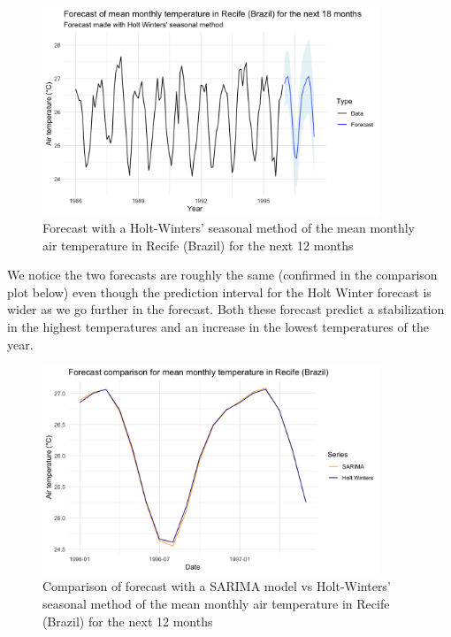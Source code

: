 \begin{figure}[H]
	\centering
	\includegraphics[width=0.9\textwidth]{figures/forecast/hw_forecast.png}
	\caption{Forecast with a Holt-Winters' seasonal method of the mean monthly air temperature in Recife (Brazil) for the next 12 months}
	\label{fig:hw-forecast}
\end{figure}

We notice the two forecasts are roughly the same (confirmed in the comparison plot below) even though the prediction interval for the Holt Winter forecast is wider as we go further in the forecast. Both these forecast predict a stabilization in the highest temperatures and an increase in the lowest temperatures of the year.

\begin{figure}[H]
	\centering
	\includegraphics[width=0.9\textwidth]{figures/forecast/forecast-comparison.png}
	\caption{Comparison of forecast with a SARIMA model vs Holt-Winters' seasonal method of the mean monthly air temperature in Recife (Brazil) for the next 12 months}
	\label{fig:forecast-comparison}
\end{figure}
